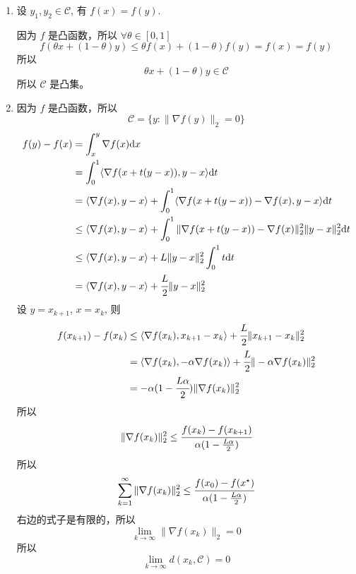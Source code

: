 \documentclass[11pt,letter,notitlepage]{article}
\begin{document}
\begin{solution}
    \begin{enumerate}
        \item 设 $y_1,y_2\in \mathcal{C}$, 有 $f(x)=f(y)$.

              因为 $f$ 是凸函数，所以 $\forall\theta\in [0,1]$
              $$f(\theta x+(1-\theta)y)\le\theta f(x)+(1-\theta)f(y)=f(x)=f(y)$$
              所以
              $$\theta x+(1-\theta)y \in \mathcal{C}$$
              所以 $\mathcal{C}$ 是凸集。
        \item 因为 $f$ 是凸函数，所以
              $$\mathcal{C}=\{ y:\|\nabla f(y)\|_2=0 \}$$
              $$\begin{aligned}
                      f(y)-f(x)
                       & = \int_x^y \nabla f(x){\rm d}x                                        \\
                       & = \int_0^1 \langle \nabla f(x+t(y-x)),y-x \rangle {\rm d}t            \\
                       & = \langle\nabla f(x),y-x \rangle
                      + \int_0^1 \langle \nabla f(x+t(y-x))-\nabla f(x),y-x \rangle {\rm d}t   \\
                       & \le \langle\nabla f(x),y-x \rangle
                      + \int_0^1 \| \nabla f(x+t(y-x))-\nabla f(x) \|_2^2 \|y-x\|_2^2 {\rm d}t \\
                       & \le \langle\nabla f(x),y-x \rangle +L\|y-x\|_2^2 \int_0^1 {t{\rm d}t} \\
                       & = \langle \nabla f(x),y-x \rangle+\cfrac{L}{2}\|y-x\|_2^2
                  \end{aligned}$$
              设 $y=x_{k+1}$, $x=x_k$, 则
              $$\begin{aligned}
                      f(x_{k+1})-f(x_k)
                       & \le \langle \nabla f(x_k),x_{k+1}-x_k \rangle+\cfrac{L}{2}\|x_{k+1}-x_k\|_2^2                 \\
                       & = \langle \nabla f(x_k),-\alpha\nabla f(x_k) \rangle+\cfrac{L}{2}\|-\alpha\nabla f(x_k)\|_2^2 \\
                       & =-\alpha (1-\cfrac{L\alpha}{2}) \|\nabla f(x_k)\|_2^2
                  \end{aligned}$$
              所以
              $$\|\nabla f(x_k)\|_2^2\le \cfrac{f(x_k)-f(x_{k+1})}{\alpha(1-\frac{L\alpha}{2})}$$
              所以
              $$\sum_{k=1}^{\infty}{\|\nabla f(x_k)\|_2^2} \le \cfrac{f(x_0)-f(x^\star)}{\alpha(1-\frac{L\alpha}{2})}$$
              右边的式子是有限的，所以
              $$\lim_{k\to\infty} \|\nabla f(x_k)\|_2=0$$
              所以
              $$\lim_{k\to\infty}{d(x_k,\mathcal{C})}=0$$
    \end{enumerate}
\end{solution}
\newpage
\end{document}
